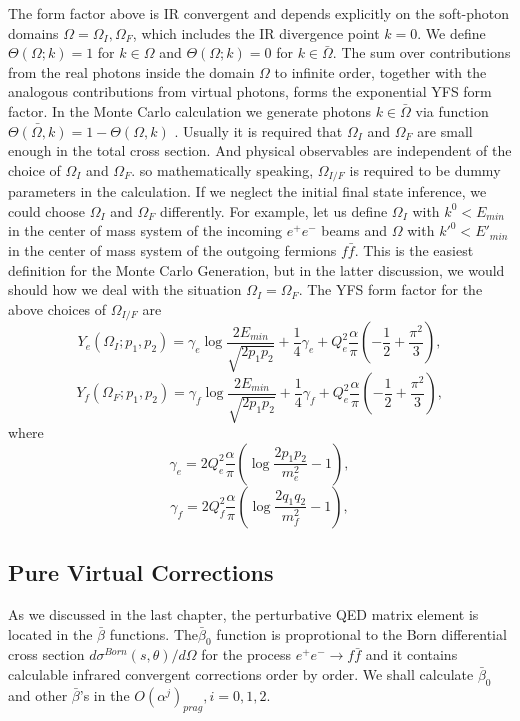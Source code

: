 The form factor above is IR convergent and depends explicitly on the soft-photon domains $\Omega = \Omega_I, \Omega_F$, which includes the IR divergence point $k=0$. We define $\Theta(\Omega;k) = 1$ for $k\in \Omega$ and $\Theta(\Omega;k) = 0$ for $k\in \bar{\Omega}$. The sum over contributions from the real photons inside the domain $\Omega$ to infinite order, together with the analogous contributions from virtual photons, forms the exponential YFS form factor. In the Monte Carlo calculation we generate photons $k\in \bar{\Omega}$ via function $\bar{\Theta(\Omega,k)} = 1 - \Theta(\Omega,k)$ 
. Usually it is required that $
\Omega_I$ and  $\Omega_F$ are small enough in the total cross section. And physical observables are independent of the choice of $\Omega_I$ and $\Omega_F$. so mathematically speaking, $\Omega_{I/F}$ is required to be dummy parameters in the calculation. If we neglect the initial final state inference, we could choose $\Omega_I$ and $\Omega_F$ differently. For example, let us define $\Omega_I$ with $k^0 < E_{min}$ in the center of mass system of the incoming $e^+ e^-$ beams and $\Omega$ with $k'^0<E'_{min}$ in the center of mass system of the outgoing fermions $f\bar{f}$. This is the easiest definition for the Monte Carlo Generation, but in the latter discussion, we would should how we deal with the situation $\Omega_I = \Omega_F$. The YFS form factor for the above choices of $\Omega_{I/F}$ are 
\begin{equation}
Y_e(\Omega_I;p_1,p_2) = \gamma_e\log\frac{2E_{min}}{\sqrt{2p_1 p_2}}+\frac{1}{4}\gamma_e + Q_e^2\frac{\alpha}{\pi}\left(-\frac{1}{2}+\frac{\pi^2}{3}\right),
\end{equation}
\begin{equation}
Y_f(\Omega_F;p_1,p_2) = \gamma_f\log\frac{2E_{min}}{\sqrt{2p_1 p_2}}+\frac{1}{4}\gamma_f + Q_e^2\frac{\alpha}{\pi}\left(-\frac{1}{2}+\frac{\pi^2}{3}\right),
\end{equation}
where
\begin{equation}
\gamma_e = 2Q_e^2\frac{\alpha}{\pi}\left(\log\frac{2p_1 p_2}{m_e^2}-1\right),
\end{equation}
\begin{equation}
\gamma_f = 2Q_f^2\frac{\alpha}{\pi}\left(\log\frac{2q_1 q_2}{m_f^2}-1\right),
\end{equation}

\subsection{Pure Virtual Corrections}
As we discussed in the last chapter, the perturbative QED matrix element is located in the $\bar{\beta}$ functions. The$\bar{\beta}_0$ function is proprotional to the Born differential cross section $d\sigma^{Born}(s,\theta)/d\Omega$ for the process $e^+ e^- \to f\bar{f}$ and it contains calculable infrared convergent corrections order by order. We shall calculate $\bar{\beta}_0$ and other $\bar{\beta}$'s in the $O(\alpha^j)_{prag}, i=0,1,2$. 

